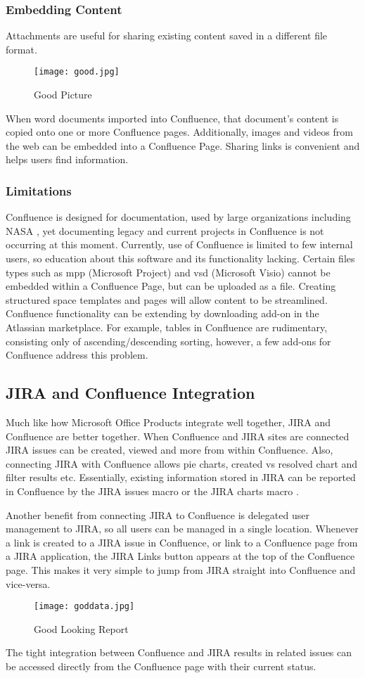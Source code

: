 \subsubsection{Embedding Content}
Attachments are useful for sharing existing content saved in a different file format. 
\begin{figure}
	\centering
	\texttt{[image: good.jpg]}
	\caption{Good Picture}
\end{figure} 
When word documents imported into Confluence, that document's content is copied onto one or more Confluence pages. Additionally, images and videos from the web can be embedded into a Confluence Page. Sharing links is convenient and helps users find information.

\subsubsection{Limitations}
Confluence is designed for documentation, used by large organizations including NASA \cite{NASA:Online}, yet documenting legacy and current projects in Confluence is not occurring at this moment. Currently, use of Confluence is limited to few internal users, so education about this software and its functionality lacking. Certain files types such as mpp (Microsoft Project) and vsd (Microsoft Visio) cannot be embedded within a Confluence Page, but can be uploaded as a file.  Creating structured space templates and pages will allow content to be streamlined. Confluence functionality can be extending by downloading add-on in the Atlassian marketplace. For example, tables in Confluence are rudimentary, consisting only of ascending/descending sorting, however, a few add-ons for Confluence address this problem.

\subsection{JIRA and Confluence Integration}
Much like how Microsoft Office Products integrate well together, JIRA and Confluence are better together. When \gls{Confluence} and JIRA sites are connected JIRA issues can be created, viewed and more from within Confluence. Also, connecting JIRA with Confluence allows pie charts, created vs resolved chart and filter results etc.  Essentially, existing information stored in JIRA can be reported in Confluence by the JIRA issues macro or the JIRA charts macro \cite{JAC:Online}.

\noindent Another benefit from connecting JIRA to \gls{Confluence} is delegated user management to \gls{JIRA}, so all users can be managed in a single location. Whenever a link is created to a JIRA issue in Confluence, or link to a Confluence page from a JIRA application, the JIRA Links button appears at the top of the Confluence page. This makes it very simple to jump from JIRA straight into Confluence and vice-versa.
\begin{figure}
	\centering
	\texttt{[image: goddata.jpg]}
	\caption{Good Looking Report}
\end{figure} 
\noindent The tight integration between Confluence and JIRA results in related issues can be accessed directly from the Confluence page with their current status.